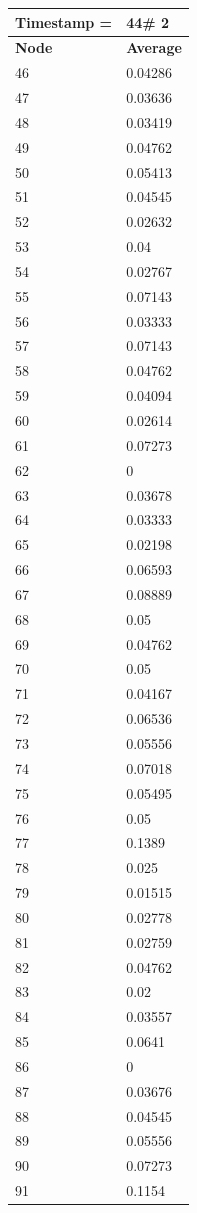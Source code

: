 \begin{tabular}{|l||l|}
\hline
\textbf{Timestamp =} & \textbf{44}\# 2\\\hline
	\textbf{Node} & \textbf{Average} \\ \hline
\hline
	46 & 0.04286 \\ \hline
	47 & 0.03636 \\ \hline
	48 & 0.03419 \\ \hline
	49 & 0.04762 \\ \hline
	50 & 0.05413 \\ \hline
	51 & 0.04545 \\ \hline
	52 & 0.02632 \\ \hline
	53 & 0.04 \\ \hline
	54 & 0.02767 \\ \hline
	55 & 0.07143 \\ \hline
	56 & 0.03333 \\ \hline
	57 & 0.07143 \\ \hline
	58 & 0.04762 \\ \hline
	59 & 0.04094 \\ \hline
	60 & 0.02614 \\ \hline
	61 & 0.07273 \\ \hline
	62 & 0 \\ \hline
	63 & 0.03678 \\ \hline
	64 & 0.03333 \\ \hline
	65 & 0.02198 \\ \hline
	66 & 0.06593 \\ \hline
	67 & 0.08889 \\ \hline
	68 & 0.05 \\ \hline
	69 & 0.04762 \\ \hline
	70 & 0.05 \\ \hline
	71 & 0.04167 \\ \hline
	72 & 0.06536 \\ \hline
	73 & 0.05556 \\ \hline
	74 & 0.07018 \\ \hline
	75 & 0.05495 \\ \hline
	76 & 0.05 \\ \hline
	77 & 0.1389 \\ \hline
	78 & 0.025 \\ \hline
	79 & 0.01515 \\ \hline
	80 & 0.02778 \\ \hline
	81 & 0.02759 \\ \hline
	82 & 0.04762 \\ \hline
	83 & 0.02 \\ \hline
	84 & 0.03557 \\ \hline
	85 & 0.0641 \\ \hline
	86 & 0 \\ \hline
	87 & 0.03676 \\ \hline
	88 & 0.04545 \\ \hline
	89 & 0.05556 \\ \hline
	90 & 0.07273 \\ \hline
	91 & 0.1154 \\ \hline
\end{tabular}
